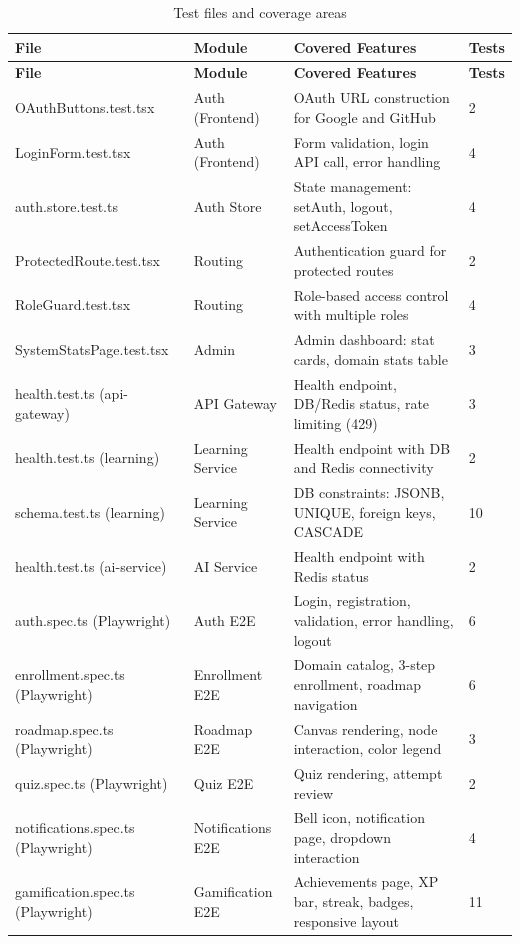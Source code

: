 \begin{longtable}{p{3cm}p{3.5cm}p{5cm}p{1.5cm}}
\caption{Test files and coverage areas}
\label{tab:test-files}\\
\toprule
\textbf{File} & \textbf{Module} & \textbf{Covered Features} & \textbf{Tests} \\
\midrule
\endfirsthead
\toprule
\textbf{File} & \textbf{Module} & \textbf{Covered Features} & \textbf{Tests} \\
\midrule
\endhead
OAuthButtons.test.tsx & Auth (Frontend) & OAuth URL construction for Google and GitHub & 2 \\
LoginForm.test.tsx & Auth (Frontend) & Form validation, login API call, error handling & 4 \\
auth.store.test.ts & Auth Store & State management: setAuth, logout, setAccessToken & 4 \\
ProtectedRoute.test.tsx & Routing & Authentication guard for protected routes & 2 \\
RoleGuard.test.tsx & Routing & Role-based access control with multiple roles & 4 \\
SystemStatsPage.test.tsx & Admin & Admin dashboard: stat cards, domain stats table & 3 \\
health.test.ts (api-gateway) & API Gateway & Health endpoint, DB/Redis status, rate limiting (429) & 3 \\
health.test.ts (learning) & Learning Service & Health endpoint with DB and Redis connectivity & 2 \\
schema.test.ts (learning) & Learning Service & DB constraints: JSONB, UNIQUE, foreign keys, CASCADE & 10 \\
health.test.ts (ai-service) & AI Service & Health endpoint with Redis status & 2 \\
auth.spec.ts (Playwright) & Auth E2E & Login, registration, validation, error handling, logout & 6 \\
enrollment.spec.ts (Playwright) & Enrollment E2E & Domain catalog, 3-step enrollment, roadmap navigation & 6 \\
roadmap.spec.ts (Playwright) & Roadmap E2E & Canvas rendering, node interaction, color legend & 3 \\
quiz.spec.ts (Playwright) & Quiz E2E & Quiz rendering, attempt review & 2 \\
notifications.spec.ts (Playwright) & Notifications E2E & Bell icon, notification page, dropdown interaction & 4 \\
gamification.spec.ts (Playwright) & Gamification E2E & Achievements page, XP bar, streak, badges, responsive layout & 11 \\

\end{longtable}

